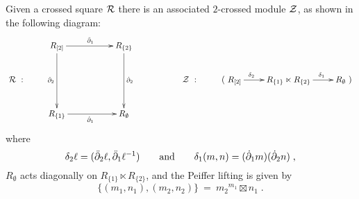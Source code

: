 \medskip
\begin{prop} \label{prop:2xmod-xsq}
Given a crossed square $\mathcal{R}$ there is an associated $2$-crossed module 
$\mathcal{Z}$, as shown in the following diagram: 
$$
\xymatrix{
  & R_{[2]} \ar[rr]^{\ddbdyo} \ar[dd]_{\ddbdyt} 
    & & R_{\{2\}} \ar[dd]^{\dbdyt} 
        & & & & &  \\
  \calR~: 
  & & & & & \calZ~: 
            & (~R_{[2]} \ar[r]^(0.35){\delta_2} 
              &  R_{\{1\}} \ltimes R_{\{2\}} \ar[r]^(0.6){\delta_1}
                & R_{\emptyset}~) \\
  & R_{\{1\}} \ar[rr]_{\dbdyo}  
    & & R_{\emptyset} 
        & & & & &
}
$$
where
$$
\delta_2 \ell = (\ddot{\partial}_2 \ell, \ddot{\partial}_1 \ell^{-1})
\qquad\mbox{and}\qquad
\delta_1(m,n) = (\dot{\partial}_1 m)(\dot{\partial}_2 n)\;,
$$
$R_{\emptyset}$ acts diagonally on $R_{\{1\}} \ltimes R_{\{2\}}$,
and the Peiffer lifting is given by
$$
\{(m_1, n_1),(m_2,n_2) \} ~=~ {m_2}^{m_1} \boxtimes n_1\;.
$$
\end{prop}
